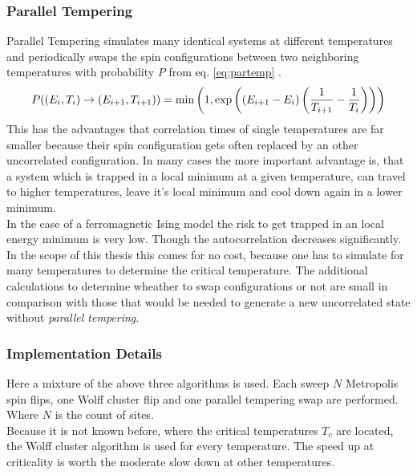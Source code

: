     \subsubsection{Parallel Tempering}
        Parallel Tempering\cite{ParallelTempering1986} simulates many identical systems at different
        temperatures and periodically swaps the spin configurations
        between two neighboring temperatures with probability \(P\) from
        eq. \eqref{eq:partemp} \cite[S. ??]{NewmanBarkema1999} \cite[S. 155ff]{Katzgraber2011}.
        \begin{equation}
            P((E_i,T_i) \to (E_{i+1},T_{i+1})) = \min\left(1,\exp\left(\left(E_{i+1}-E_i\right)\left(\frac{1}{T_{i+1}}-\frac{1}{T_i}\right)\right)\right)
            \label{eq:partemp}
        \end{equation}
        This has the advantages that correlation times of single
        temperatures are far smaller because their spin configuration
        gets often replaced by an other uncorrelated configuration. In
        many cases the more important advantage is, that a system which
        is trapped in a local minimum at a given temperature, can travel
        to higher temperatures, leave it's local minimum and cool down
        again in a lower minimum.\\
        In the case of a ferromagnetic Ising model the risk to get trapped
        in an local energy minimum is very low. Though the autocorrelation
        decreases significantly. In the scope of this thesis this comes
        for no cost, because one has to simulate for many temperatures
        to determine the critical temperature. The additional calculations
        to determine wheather to swap configurations or not are small in
        comparison with those that would be needed to generate a new
        uncorrelated state without \emph{parallel tempering}.

    \subsubsection{Implementation Details}
        Here a mixture of the above three algorithms is used.
        Each sweep \(N\) Metropolis spin flips, one Wolff cluster flip
        and one parallel tempering swap are performed. Where \(N\) is the
        count of sites.\\
        Because it is not known before, where the critical temperatures
        \(T_c\) are located, the Wolff cluster algorithm is used for
        every temperature. The speed up at criticality is worth the
        moderate slow down at other temperatures.

